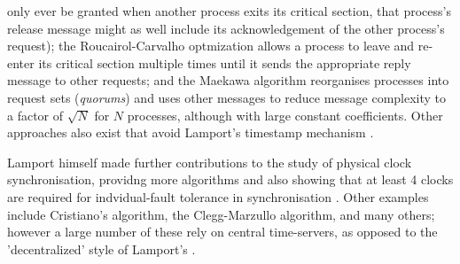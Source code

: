 \documentclass[11pt]{article}
\begin{document}
only ever be granted when another process exits its critical section, that
process's release message might as well include its acknowledgement of the other
process's request); the Roucairol-Carvalho optmization allows a process to leave
and re-enter its critical section multiple times until it sends the appropriate
reply message to other requests; and the Maekawa algorithm reorganises processes
into request sets (\textit{quorums}) and uses other messages to reduce message
complexity to a factor of \( \sqrt{N} \) for \( N \) processes, although with
large constant coefficients. Other approaches also exist that avoid Lamport's
timestamp mechanism \cite{velazques1993survey}.
\par
Lamport himself made further contributions to the study of physical clock
synchronisation, providng more algorithms and also showing that at least 4
clocks are required for indvidual-fault tolerance in synchronisation
\cite{lamport1985synchronizing}. Other examples include Cristiano's algorithm,
the Clegg-Marzullo algorithm, and many others; however a large number of these
rely on central time-servers, as opposed to the 'decentralized' style of
Lamport's \cite{clegg1996clock}.


 

\end{document}
